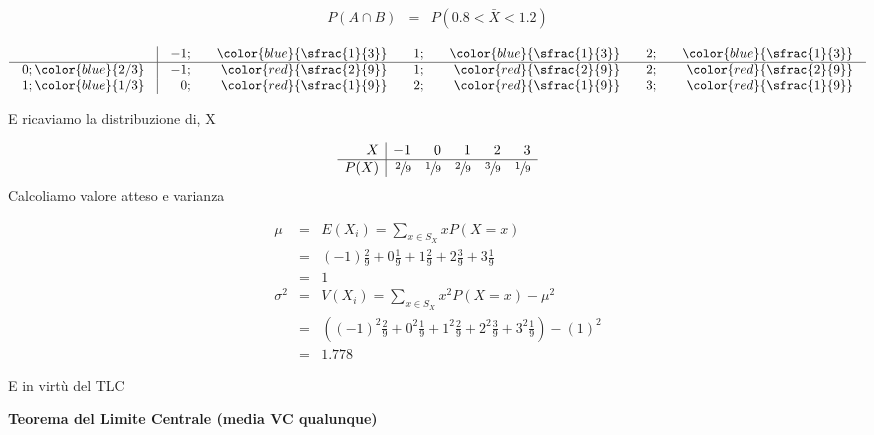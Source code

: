 \documentclass[
  11pt,
]{book}
\theoremstyle{mytheoremstyle}
\theoremstyle{mydefstyle}
\newenvironment{sol}
  {
  \begin{tcolorbox}[enhanced,breakable,arc=0.1mm,boxrule=1pt,colback=white,colframe=iblue,
  title=\bf \fontfamily{lmss}\selectfont \hspace{.5 cm} Soluzione,drop fuzzy shadow]

}{
\end{tcolorbox}
  }
\begin{document}
\begin{sol}
\begin{eqnarray*}
   P(A\cap B)&=&  P(0.8<\bar X<1.2)
\end{eqnarray*}

\normalsize

\[\arraycolsep=10pt\def\arraystretch{1}\begin{array}{ r|rrrrrr }
& -1 ;&\color{blue}{ \sfrac{ 1 } { 3 }} & 1 ;&\color{blue}{ \sfrac{ 1 } { 3 }} & 2 ;&\color{blue}{ \sfrac{ 1 } { 3 }} \\ 
\hline 
0 ;\color{blue}{ 2 / 3 }& -1;&\color{red}{\sfrac{2}{9}}& 1;&\color{red}{\sfrac{2}{9}}& 2;&\color{red}{\sfrac{2}{9}}\\ 
1 ;\color{blue}{ 1 / 3 }& 0;&\color{red}{\sfrac{1}{9}}& 2;&\color{red}{\sfrac{1}{9}}& 3;&\color{red}{\sfrac{1}{9}}\\ 
\end{array}
 \]

\normalsize E ricaviamo la distribuzione di, X

\normalsize

\[
     \begin{array}{ r|rrrrr }
 X  & -1& 0& 1& 2& 3 \\ 
 \hline 
 P( X ) & \sfrac{2}{9}& \sfrac{1}{9}& \sfrac{2}{9}& \sfrac{3}{9}& \sfrac{1}{9} \\ 
 \end{array}
 \]
\normalsize Calcoliamo valore atteso e varianza

\normalsize

\begin{eqnarray*} \mu &=& E(X_i) = \sum_{x\in S_X}x P(X=x)\\ 
 &=& ( -1 ) \frac { 2 }{ 9 }+ 0  \frac { 1 }{ 9 }+ 1  \frac { 2 }{ 9 }+ 2  \frac { 3 }{ 9 }+ 3  \frac { 1 }{ 9 } \\ 
            &=& 1 \\ 
 \sigma^2 &=& V(X_i) = \sum_{x\in S_X}x^2 P(X=x)-\mu^2\\ 
 &=&\left( ( -1 ) ^2\frac { 2 }{ 9 }+ 0  ^2\frac { 1 }{ 9 }+ 1  ^2\frac { 2 }{ 9 }+ 2  ^2\frac { 3 }{ 9 }+ 3  ^2\frac { 1 }{ 9 } \right)-( 1 )^2\\ 
            &=& 1.778 
\end{eqnarray*}
\normalsize

E in virtù del TLC

\textbf{Teorema del Limite Centrale (media VC qualunque)}


\end{sol}
\end{document}
